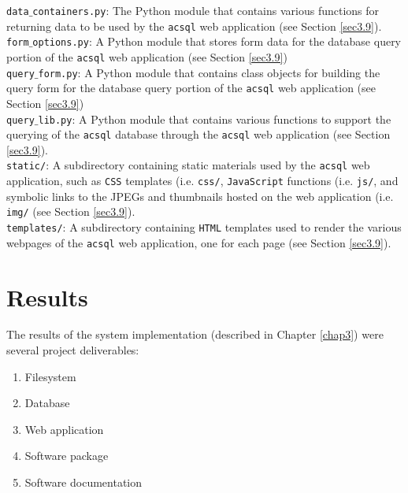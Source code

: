 \documentclass[10pt,journal,compsoc]{IEEEtran}
\begin{document}
\noindent\texttt{data$\_$containers.py}: The Python module that contains various functions for returning data to be used by the \texttt{acsql} web application (see Section \ref{sec3.9}).\\

\noindent\texttt{form$\_$options.py}: A Python module that stores form data for the database query portion of the \texttt{acsql} web application (see Section \ref{sec3.9})\\

\noindent\texttt{query$\_$form.py}: A Python module that contains class objects for building the query form for the database query portion of the \texttt{acsql} web application (see Section \ref{sec3.9})\\

\noindent\texttt{query$\_$lib.py}: A Python module that contains various functions to support the querying of the \texttt{acsql} database through the \texttt{acsql} web application (see Section \ref{sec3.9}).\\

\noindent\texttt{static/}: A subdirectory containing static materials used by the \texttt{acsql} web application, such as \texttt{CSS} templates (i.e. \texttt{css/}, \texttt{JavaScript} functions
(i.e. \texttt{js/}, and symbolic links to the JPEGs and thumbnails hosted on the web application (i.e. \texttt{img/} (see Section \ref{sec3.9}).\\

\noindent\texttt{templates/}: A subdirectory containing \texttt{HTML} templates used to render the various webpages of the \texttt{acsql} web application, one for each page (see Section \ref{sec3.9}).\\


\section{Results} \label{chap4}

The results of the system implementation (described in Chapter \ref{chap3}) were several project deliverables:

\begin{enumerate}
\item Filesystem
\item Database
\item Web application
\item Software package
\item Software documentation
\end{enumerate}
\end{document}
